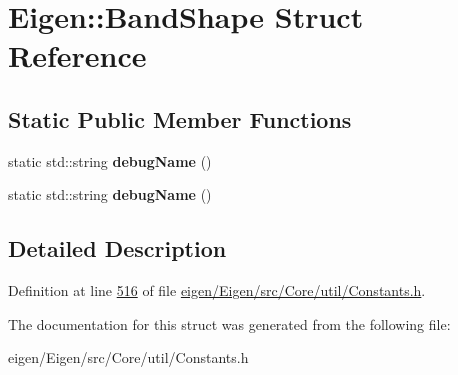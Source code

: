 \hypertarget{struct_eigen_1_1_band_shape}{}\section{Eigen\+:\+:Band\+Shape Struct Reference}
\label{struct_eigen_1_1_band_shape}
\subsection*{Static Public Member Functions}
\begin{DoxyCompactItemize}
\item 
\mbox{\label{struct_eigen_1_1_band_shape_aac060c162decb089ef61c22634a1652f}} 
static std\+::string {\bfseries debug\+Name} ()
\item 
\mbox{\label{struct_eigen_1_1_band_shape_aac060c162decb089ef61c22634a1652f}} 
static std\+::string {\bfseries debug\+Name} ()
\end{DoxyCompactItemize}


\subsection{Detailed Description}


Definition at line \hyperlink{eigen_2_eigen_2src_2_core_2util_2_constants_8h_source_l00516}{516} of file \hyperlink{eigen_2_eigen_2src_2_core_2util_2_constants_8h_source}{eigen/\+Eigen/src/\+Core/util/\+Constants.\+h}.



The documentation for this struct was generated from the following file\+:\begin{DoxyCompactItemize}
\item 
eigen/\+Eigen/src/\+Core/util/\+Constants.\+h\end{DoxyCompactItemize}
